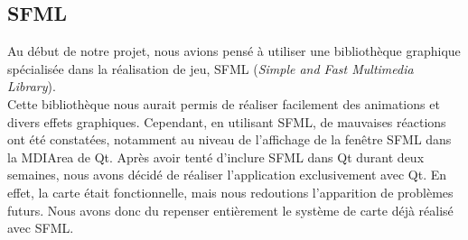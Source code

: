 \subsection{SFML}

Au début de notre projet, nous avions pensé à utiliser une bibliothèque graphique spécialisée dans la réalisation de jeu, SFML (\textit{Simple and Fast Multimedia Library}).\\

Cette bibliothèque nous aurait permis de réaliser facilement des animations et divers effets graphiques. 
Cependant, en utilisant SFML, de mauvaises réactions ont été constatées, notamment au niveau de l'affichage de la fenêtre SFML dans la MDIArea de Qt.
Après avoir tenté d'inclure SFML dans Qt durant deux semaines, nous avons décidé de réaliser l'application exclusivement avec Qt. En effet, la carte était fonctionnelle, mais nous redoutions l'apparition de problèmes futurs. Nous avons donc du repenser entièrement le système de carte déjà réalisé avec SFML.